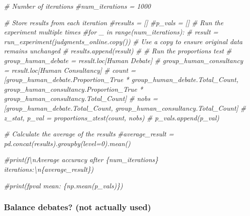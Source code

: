 \documentclass[
]{article}
\newenvironment{Shaded}{\begin{snugshade}}{\end{snugshade}}
\newcommand{\CommentTok}[1]{\textcolor[rgb]{0.56,0.35,0.01}{\textit{#1}}}
\begin{document}
\begin{Shaded}
\begin{Highlighting}[]
\CommentTok{\# Number of iterations}
\CommentTok{\#num\_iterations = 1000}

\CommentTok{\# Store results from each iteration}
\CommentTok{\#results = []}
\CommentTok{\#p\_vals = []}
\CommentTok{\# Run the experiment multiple times}
\CommentTok{\#for \_ in range(num\_iterations):}
\CommentTok{\#    result = run\_experiment(judgments\_online.copy())  \# Use a copy to ensure original data remains unchanged}
\CommentTok{\#    results.append(result)}
\CommentTok{\#    \# Run the proportions test}
\CommentTok{\#    group\_human\_debate = result.loc[\textquotesingle{}Human Debate\textquotesingle{}]}
\CommentTok{\#    group\_human\_consultancy = result.loc[\textquotesingle{}Human Consultancy\textquotesingle{}]}
\CommentTok{\#    count = [group\_human\_debate.Proportion\_True * group\_human\_debate.Total\_Count, group\_human\_consultancy.Proportion\_True * group\_human\_consultancy.Total\_Count]}
\CommentTok{\#    nobs = [group\_human\_debate.Total\_Count, group\_human\_consultancy.Total\_Count]}
\CommentTok{\#    z\_stat, p\_val = proportions\_ztest(count, nobs)}
\CommentTok{\#    p\_vals.append(p\_val)}

\CommentTok{\# Calculate the average of the results}
\CommentTok{\#average\_result = pd.concat(results).groupby(level=0).mean()}

\CommentTok{\#print(f\textquotesingle{}\textbackslash{}nAverage accuracy after \{num\_iterations\} iterations:\textbackslash{}n\{average\_result\}\textquotesingle{})}

\CommentTok{\#print(f\textquotesingle{}pval mean: \{np.mean(p\_vals)\}\textquotesingle{})}
\end{Highlighting}
\end{Shaded}

\subsubsection{Balance debates? (not actually
used)}\label{balance-debates-not-actually-used}
\end{document}
